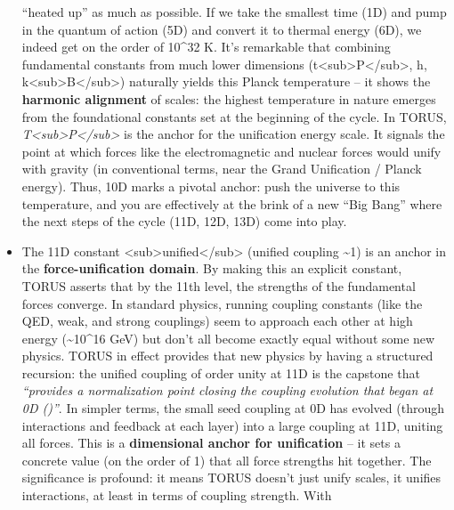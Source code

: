 \documentclass[
]{article}
\begin{document}
\begin{itemize}
  ``heated up'' as much as possible\hspace{0pt}. If we take the smallest
  time (1D) and pump in the quantum of action (5D) and convert it to
  thermal energy (6D), we indeed get on the order of 10\^{}32
  K\hspace{0pt}. It's remarkable that combining fundamental constants
  from much lower dimensions
  (t\textless sub\textgreater P\textless/sub\textgreater, h,
  k\textless sub\textgreater B\textless/sub\textgreater) naturally
  yields this Planck temperature -- it shows the \textbf{harmonic
  alignment} of scales: the highest temperature in nature emerges from
  the foundational constants set at the beginning of the
  cycle\hspace{0pt}. In TORUS,
  \emph{T\textless sub\textgreater P\textless/sub\textgreater{}} is the
  anchor for the unification energy scale. It signals the point at which
  forces like the electromagnetic and nuclear forces would unify with
  gravity (in conventional terms, near the Grand Unification / Planck
  energy). Thus, 10D marks a pivotal anchor: push the universe to this
  temperature, and you are effectively at the brink of a new ``Big
  Bang'' where the next steps of the cycle (11D, 12D, 13D) come into
  play.
\item
  The 11D constant
  \alpha\textless sub\textgreater unified\textless/sub\textgreater{} (unified
  coupling \textasciitilde1) is an anchor in the
  \textbf{force-unification domain}. By making this an explicit
  constant, TORUS asserts that by the 11th level, the strengths of the
  fundamental forces converge. In standard physics, running coupling
  constants (like the QED, weak, and strong couplings) seem to approach
  each other at high energy (\textasciitilde10\^{}16 GeV) but don't all
  become exactly equal without some new physics. TORUS in effect
  provides that new physics by having a structured recursion: the
  unified coupling of order unity at 11D is the capstone that
  \emph{``provides a normalization point closing the coupling evolution
  that began at 0D (\alpha)''}\hspace{0pt}. In simpler terms, the small seed
  coupling at 0D has evolved (through interactions and feedback at each
  layer) into a large coupling at 11D, uniting all forces. This is a
  \textbf{dimensional anchor for unification} -- it sets a concrete
  value (on the order of 1) that all force strengths hit together. The
  significance is profound: it means TORUS doesn't just unify scales, it
  unifies interactions, at least in terms of coupling strength. With

\end{itemize}
\end{document}
